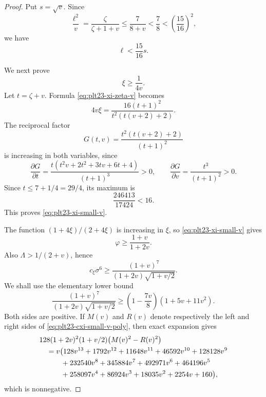 \documentclass[11pt]{article}
\numberwithin{equation}{section}
\begin{document}
\begin{proof}
  Put $s=\sqrt v$.
  Since
  \[
    \frac{\ell^2}{v}=\frac{\zeta}{\zeta+1+v}
    \le\frac{7}{8+v}<\frac{7}{8}<\left(\frac{15}{16}\right)^2,
  \]
  we have
  \begin{equation}\label{eq:plt23-ell-small-v}
    \ell<\frac{15}{16}s.
  \end{equation}

  We next prove
  \begin{equation}\label{eq:plt23-xi-small-v}
    \xi\ge\frac{1}{4v}.
  \end{equation}
  Let $t=\zeta+v$.
  Formula \eqref{eq:plt23-xi-zeta-v} becomes
  \[
    4v\xi=
    \frac{16(t+1)^2}{t^2(t(v+2)+2)}.
  \]
  The reciprocal factor
  \[
    G(t,v)=\frac{t^2(t(v+2)+2)}{(t+1)^2}
  \]
  is increasing in both variables, since
  \[
    \frac{\partial G}{\partial t}
    =\frac{t(t^2v+2t^2+3tv+6t+4)}{(t+1)^3}>0,
    \qquad
    \frac{\partial G}{\partial v}=\frac{t^3}{(t+1)^2}>0.
  \]
  Since $t\le7+1/4=29/4$, its maximum is
  \[
    \frac{246413}{17424}<16.
  \]
  This proves \eqref{eq:plt23-xi-small-v}.

  The function $(1+4\xi)/(2+4\xi)$ is increasing in $\xi$, so \eqref{eq:plt23-xi-small-v} gives
  \[
    \varphi\ge\frac{1+v}{1+2v}.
  \]
  Also $\Lambda>1/(2+v)$, hence
  \[
    c_\xi\sigma^6
    \ge\frac{(1+v)^7}{(1+2v)\sqrt{1+v/2}}.
  \]
  We shall use the elementary lower bound
  \begin{equation}\label{eq:plt23-cxi-small-v-poly}
    \frac{(1+v)^7}{(1+2v)\sqrt{1+v/2}}
    \ge\left(1-\frac{7v}{8}\right)(1+5v+11v^2).
  \end{equation}
  Both sides are positive.
  If $M(v)$ and $R(v)$ denote respectively the left and right sides of \eqref{eq:plt23-cxi-small-v-poly}, then exact expansion gives
  \begin{align}
    &128(1+2v)^2(1+v/2)\bigl(M(v)^2-R(v)^2\bigr) \notag\\
    &\quad=v\bigl(128v^{13}+1792v^{12}+11648v^{11}+46592v^{10}
    +128128v^9 \notag\\
    &\qquad\quad+232540v^8+345884v^7+492971v^6+464196v^5 \notag\\
    &\qquad\quad+258097v^4+86924v^3+18035v^2+2254v+160\bigr), \label{eq:plt23-small-v-square-diff}
  \end{align}
  which is nonnegative.


\end{proof}
\end{document}
